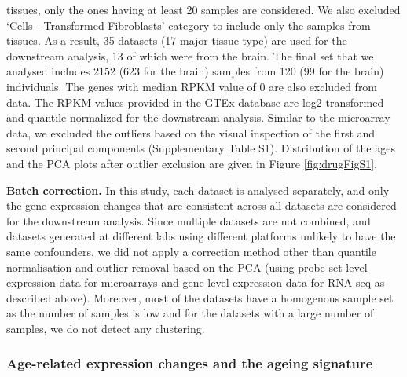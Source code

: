 \documentclass[12pt,twoside]{unicam}
\begin{document}
tissues, only the ones having at least 20 samples are considered. We also excluded `Cells - Transformed Fibroblasts' category to include only the samples from tissues. As a result, 35 datasets (17 major tissue type) are used for the downstream analysis, 13 of which were from the brain. The final set that we analysed includes 2152 (623 for the brain) samples from 120 (99 for the brain) individuals. The genes with median RPKM value of 0 are also excluded from data. The RPKM values provided in the GTEx database are log2 transformed and quantile normalized for the downstream analysis. Similar to the microarray data, we excluded the outliers based on the visual inspection of the first and second principal components (Supplementary Table S1). Distribution of the ages and the PCA plots after outlier exclusion are given in Figure \ref{fig:drugFigS1}.

\textbf{Batch correction.} In this study, each dataset is analysed separately, and only the gene expression changes that are consistent across all datasets are considered for the downstream analysis. Since multiple datasets are not combined, and datasets generated at different labs using different platforms unlikely to have the same confounders, we did not apply a correction method other than quantile normalisation and outlier removal based on the PCA (using probe-set level expression data for microarrays and gene-level expression data for RNA-seq as described above). Moreover, most of the datasets have a homogenous sample set as the number of samples is low and for the datasets with a large number of samples, we do not detect any clustering.

\hypertarget{ageingSignatureMethods}{%
\subsubsection{Age-related expression changes and the ageing signature}\label{ageingSignatureMethods}}
\end{document}
